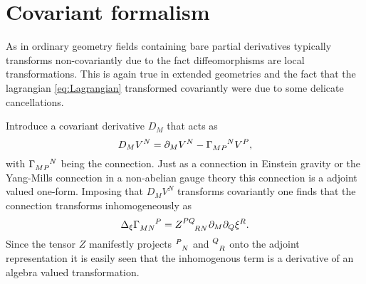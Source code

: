 \section{Covariant formalism}
As in ordinary geometry fields containing bare partial derivatives typically transforms non-covariantly due to the fact diffeomorphisms are local transformations. This is again true in extended geometries and the fact that the lagrangian \eqref{eq:Lagrangian} transformed covariantly were due to some delicate cancellations. 

Introduce a covariant derivative $D_M$ that acts as 
\begin{equation}
    D_MV^N = \pd_M V^N-\tensor{\Gamma}{_{MP}^N}V^P,
\end{equation}
with $\tensor{\Gamma}{_{MP}^N}$ being the connection. Just as a connection in Einstein gravity or the Yang-Mills connection in a non-abelian gauge theory this connection is a adjoint valued one-form. Imposing that $D_MV^N$ transforms covariantly one finds that the connection transforms inhomogeneously as 
\begin{equation}
    \Delta_\xi \tensor{\Gamma}{_{MN}^P} = \tensor{Z}{^{PQ}_{RN}}\pd_M\pd_Q\xi^R. 
\end{equation}
Since the tensor $Z$ manifestly projects $\tensor{}{^P_N}$ and $\tensor{}{^Q_R}$ onto the adjoint representation it is easily seen that the inhomogenous term is a derivative of an algebra valued transformation. 